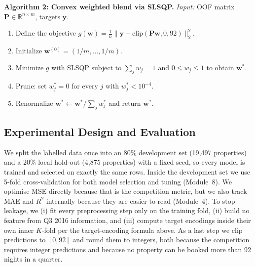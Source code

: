 \documentclass[journal]{IEEEtran}
\begin{document}
\vspace{2pt}
\noindent\textbf{Algorithm 2: Convex weighted blend via SLSQP.}
\emph{Input:} OOF matrix $\mathbf{P}\in\mathbb{R}^{n\times m}$, targets
$\mathbf{y}$.
\begin{enumerate}
\item Define the objective
$g(\mathbf{w})=\frac{1}{n}\lVert\mathbf{y}-\mathrm{clip}(\mathbf{P}\mathbf{w},0,92)\rVert_2^2$.
\item Initialize $\mathbf{w}^{(0)}=(1/m,\dots,1/m)$.
\item Minimize $g$ with SLSQP subject to $\sum_j w_j=1$ and $0\le w_j\le1$ to
obtain $\mathbf{w}^{*}$.
\item Prune: set $w_j^{*}=0$ for every $j$ with $w_j^{*}<10^{-4}$.
\item Renormalize $\mathbf{w}^{*}\leftarrow\mathbf{w}^{*}/\sum_j w_j^{*}$ and
return $\mathbf{w}^{*}$.
\end{enumerate}
\vspace{2pt}

\subsection{Experimental Design and Evaluation}
We split the labelled data once into an 80\% development set (19{,}497
properties) and a 20\% local hold-out (4{,}875 properties) with a fixed seed, so
every model is trained and selected on exactly the same rows. Inside the
development set we use 5-fold cross-validation for both model selection and
tuning (Module~8). We optimise MSE directly because that is the competition
metric, but we also track MAE and $R^2$ internally because they are easier to
read (Module~4). To stop leakage, we (i) fit every preprocessing step only on
the training fold, (ii) build no feature from Q3 2016 information, and (iii)
compute target encodings inside their own inner $K$-fold per
the target-encoding formula above. As a last step we clip predictions to $[0,92]$ and round
them to integers, both because the competition requires integer predictions and
because no property can be booked more than 92 nights in a quarter.
\end{document}
